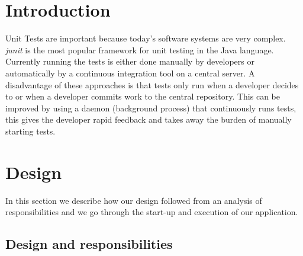 \documentclass[i2]{oss}
\begin{document}

\maketitlepage
\newpage
\tableofcontents
\pagebreak




\section*{Introduction}
\label{ssec:introduction}
Unit Tests are important because today's software systems are very 
complex.
\emph{junit} is the most popular framework for unit testing in the Java 
language.
Currently running the tests is either done manually by developers or
automatically by a continuous integration tool on a central server.
A disadvantage of these approaches is that tests only run when a 
developer decides to or when a developer commits work to the central 
repository.
This can be improved by using a daemon (background process) that continuously runs tests, this gives the developer rapid feedback and 
takes away the burden of manually starting tests.




\section{Design}
\label{ssec:design}

In this section we describe how our design followed from an analysis
of responsibilities and we go through the start-up and execution of 
our application.

\subsection{Design and responsibilities}
\end{document}
